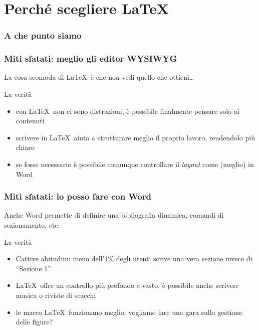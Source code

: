 \documentclass[10pt,svgnames,%
ucs,%
pdftex]{mybeamer}
\begin{document}
\section{Perch\'e scegliere \LaTeX}
\begin{frame}
	\frametitle{A che punto siamo}
\end{frame}
\begin{frame}
	\frametitle{Miti sfatati: meglio gli editor WYSIWYG}
	La cosa scomoda di \LaTeX\ \`e che non vedi quello che ottieni\dots
	\medskip
	\begin{block}{La verit\`a}
		\begin{itemize}
			\item con \LaTeX\ non ci sono distrazioni, \`e possibile finalmente pensare solo ai contenuti
			\item scrivere in \LaTeX\ aiuta a strutturare meglio il proprio lavoro, rendendolo pi\`u chiaro
			\item se fosse necessario \`e possibile comunque controllare il \textit{layout} come (meglio) in Word
		\end{itemize}
	\end{block}
\end{frame}
\begin{frame}
	\frametitle{Miti sfatati: lo posso fare con Word}
	Anche Word permette di definire una bibliografia dinamica, comandi di sezionamento, etc.
	\medskip
	\begin{block}{La verit\`a}
		\begin{itemize}
			\item Cattive abitudini: meno dell'1\% degli utenti scrive una vera sezione invece di ``Sezione 1''
			\item \LaTeX\ offre un controllo pi\`u profondo e vasto, \`e possibile anche scrivere musica o riviste di scacchi
			\item le macro \LaTeX\ funzionano meglio: vogliamo fare una gara sulla gestione delle figure?
		\end{itemize}
	\end{block}
\end{frame}
\end{document}
